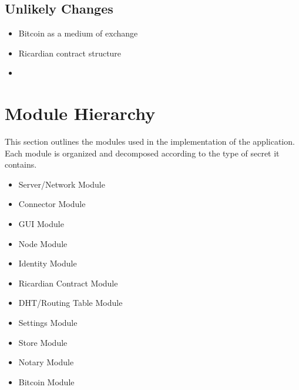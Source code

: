 \documentclass{article}
\begin{document}
\subsection{Unlikely Changes}
\begin{itemize}
\item
Bitcoin as a medium of exchange

\item
Ricardian contract structure

\item

\end{itemize}

\section*{Module Hierarchy}
This section outlines the modules used in the implementation of the application. Each module is organized and decomposed according to the type of secret it contains.
\begin{itemize}
\item
Server/Network Module
\item
Connector Module
\item
GUI Module
\item
Node Module
\item
Identity Module
\item
Ricardian Contract Module
\item
DHT/Routing Table Module
\item
Settings Module
\item
Store Module
\item
Notary Module
\item
Bitcoin Module
\end{itemize}
\end{document}
